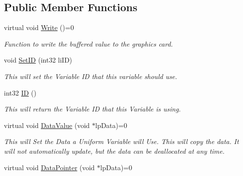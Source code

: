 \subsection*{Public Member Functions}
\begin{DoxyCompactItemize}
\item 
\hypertarget{classc_user_variable_abedb589d4c0dad6373f9afef2f34b3f0}{
virtual void \hyperlink{classc_user_variable_abedb589d4c0dad6373f9afef2f34b3f0}{Write} ()=0}
\label{classc_user_variable_abedb589d4c0dad6373f9afef2f34b3f0}

\begin{DoxyCompactList}\small\item\em Function to write the buffered value to the graphics card. \end{DoxyCompactList}\item 
\hypertarget{classc_user_variable_a155dc1766d4de63ee155fc1593da44ca}{
void \hyperlink{classc_user_variable_a155dc1766d4de63ee155fc1593da44ca}{SetID} (int32 liID)}
\label{classc_user_variable_a155dc1766d4de63ee155fc1593da44ca}

\begin{DoxyCompactList}\small\item\em This will set the Variable ID that this variable should use. \end{DoxyCompactList}\item 
\hypertarget{classc_user_variable_a554a393c326cf18d7940c45547100447}{
int32 \hyperlink{classc_user_variable_a554a393c326cf18d7940c45547100447}{ID} ()}
\label{classc_user_variable_a554a393c326cf18d7940c45547100447}

\begin{DoxyCompactList}\small\item\em This will return the Variable ID that this Variable is using. \end{DoxyCompactList}\item 
\hypertarget{classc_user_variable_a96118fa5cffd62b3b9d2c3124eaea411}{
virtual void \hyperlink{classc_user_variable_a96118fa5cffd62b3b9d2c3124eaea411}{DataValue} (void $\ast$lpData)=0}
\label{classc_user_variable_a96118fa5cffd62b3b9d2c3124eaea411}

\begin{DoxyCompactList}\small\item\em This will Set the Data a Uniform Variable will Use. This will copy the data. It will not automatically update, but the data can be deallocated at any time. \end{DoxyCompactList}\item 
\hypertarget{classc_user_variable_a37a73c2e04f393f3c53bd81c7c58bacc}{
virtual void \hyperlink{classc_user_variable_a37a73c2e04f393f3c53bd81c7c58bacc}{DataPointer} (void $\ast$lpData)=0}
\label{classc_user_variable_a37a73c2e04f393f3c53bd81c7c58bacc}


\end{DoxyCompactItemize}
